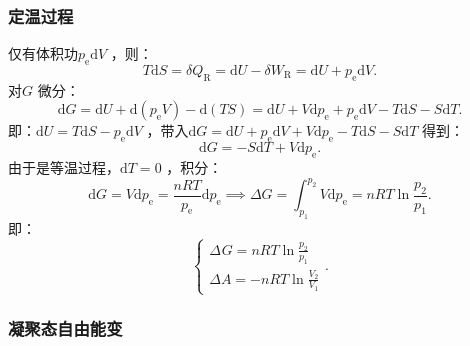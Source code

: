 \subsubsection*{定温过程}%
\label{subsub*:定温过程}
仅有体积功$p_\text{e}\mathrm{d}V$ ，则：\[
    T\mathrm{d}S = \delta Q_\text{R} = \mathrm{d}U -\delta W_\text{R} = \mathrm{d}U + p_\text{e}\mathrm{d}V
.\]
对$G$ 微分：\[
    \mathrm{d}G = \mathrm{d}U + \mathrm{d}\left( p_\text{e}V \right) - \mathrm{d}\left( TS \right) = \mathrm{d}U +V\mathrm{d}p_\text{e} + p_\text{e}\mathrm{d}V -T\mathrm{d}S -S\mathrm{d}T
.\]
即：$\mathrm{d}U = T\mathrm{d}S -p_\text{e}\mathrm{d}V$ ，带入$\mathrm{d}G = \mathrm{d}U +p_\text{e}\mathrm{d}V + V\mathrm{d}p_\text{e} -T\mathrm{d}S -S\mathrm{d}T$ 得到：\[
    \mathrm{d}G = -S\mathrm{d}T + V\mathrm{d}p_\text{e}
.\]
由于是等温过程，$\mathrm{d}T = 0$ ，积分：\[
    \mathrm{d}G = V\mathrm{d}p_\text{e} = \frac{nRT }{p_\text{e}}\mathrm{d}p_\text{e} \implies \Delta G = \int_{p_1}^{p_2} V\mathrm{d}p_\text{e} = nRT \ln \frac{p_2}{p_1}
.\]
即：\[\boxed{
    \begin{cases}
    \Delta_\text{}G = nRT \ln \frac{p_2}{p_1} \\
    \Delta A = -nRT \ln \frac{V_2}{V_1}
    \end{cases}
.}\]
\subsubsection*{凝聚态自由能变}%
\label{subsub*:凝聚态自由能变}

